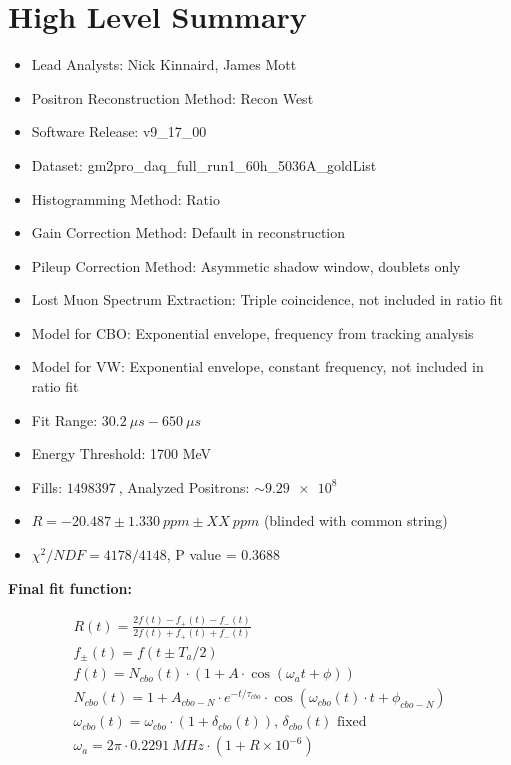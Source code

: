 \chapter*{High Level Summary}

\vspace{5mm}

\begin{itemize}
	\item{Lead Analysts: Nick Kinnaird, James Mott}
	\item{Positron Reconstruction Method: Recon West}
	\item{Software Release: v9\_17\_00}
	\item{Dataset: gm2pro\_daq\_full\_run1\_60h\_5036A\_goldList}
	\item{Histogramming Method: Ratio}
	\item{Gain Correction Method: Default in reconstruction}
	\item{Pileup Correction Method: Asymmetic shadow window, doublets only}
	\item{Lost Muon Spectrum Extraction: Triple coincidence, not included in ratio fit}
	\item{Model for CBO: Exponential envelope, frequency from tracking analysis}
	\item{Model for VW: Exponential envelope, constant frequency, not included in ratio fit}
	\item{Fit Range: $\SI{30.2}{\mu s} - \SI{650}{\mu s}$}
	\item{Energy Threshold: 1700 MeV}
	\item{Fills: $\SI{1498397}{}$, Analyzed Positrons: $\sim \SI{9.29e8}{}$}
	\item{$R = -20.487 \pm \SI{1.330}{ppm} \pm XX\SI{}{ppm}$ (blinded with common string)}
	\item{$\chi^{2}/NDF = 4178/4148$, P value = 0.3688}
\end{itemize}

\textbf{Final fit function:}

\begin{gather*}
		R(t) = \frac{2f(t) - f_{+}(t) - f_{-}(t)}{2f(t) + f_{+}(t) + f_{-}(t)} \\[5pt]
		f_{\pm}(t) = f(t \pm T_{a}/2) \\[5pt]
		f(t) = N_{cbo}(t) \cdot (1 + A \cdot \cos(\omega_{a}t + \phi)) \\[5pt]
		N_{cbo}(t) = 1 + A_{cbo-N} \cdot e^{-t/\tau_{cbo}} \cdot \cos(\omega_{cbo}(t) \cdot t + \phi_{cbo-N}) \\[5pt]
		\omega_{cbo}(t) = \omega_{cbo} \cdot (1 + \delta_{cbo}(t)) \text{, $\delta_{cbo}(t)$ fixed} \\[5pt]
		\omega_{a} = 2 \pi \cdot \SI{0.2291}{MHz} \cdot (1 + R \times 10^{-6})
\end{gather*}

